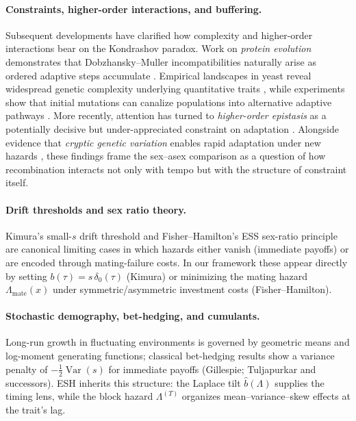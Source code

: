 \documentclass[11pt]{article}
\theoremstyle{upright}
\newcommand{\Var}{\operatorname{Var}}
\newcommand{\hazT}[1]{\Lambda^{(#1)}}          %
\begin{document}
\paragraph{Constraints, higher-order interactions, and buffering.}
Subsequent developments have clarified how complexity and higher-order interactions bear on the Kondrashov paradox. Work on \emph{protein evolution} demonstrates that Dobzhansky–Muller incompatibilities naturally arise as ordered adaptive steps accumulate \citep{Kondrashov2002}. Empirical landscapes in yeast reveal widespread genetic complexity underlying quantitative traits \citep{Brem2005}, while experiments show that initial mutations can canalize populations into alternative adaptive pathways \citep{Salverda2011}. More recently, attention has turned to \emph{higher-order epistasis} as a potentially decisive but under-appreciated constraint on adaptation \citep{Weinreich2013}. Alongside evidence that \emph{cryptic genetic variation} enables rapid adaptation under new hazards \citep{Hayden2011}, these findings frame the sex–asex comparison as a question of how recombination interacts not only with tempo but with the structure of constraint itself.

\paragraph{Drift thresholds and sex ratio theory.}
Kimura’s small-$s$ drift threshold and Fisher--Hamilton’s ESS sex-ratio principle are canonical limiting cases in which hazards either vanish (immediate payoffs) or are encoded through mating-failure costs. In our framework these appear directly by setting $b(\tau)=s\,\delta_0(\tau)$ (Kimura) or minimizing the mating hazard $\Lambda_{\mathrm{mate}}(x)$ under symmetric/asymmetric investment costs (Fisher--Hamilton).

\paragraph{Stochastic demography, bet-hedging, and cumulants.}
Long-run growth in fluctuating environments is governed by geometric means and log-moment generating functions; classical bet-hedging results show a variance penalty of $-\tfrac12\Var(s)$ for immediate payoffs (Gillespie; Tuljapurkar \citep{Tuljapurkar1982} and successors). ESH inherits this structure: the Laplace tilt $\widehat b(\Lambda)$ supplies the timing lens, while the block hazard $\hazT{T}$ organizes mean–variance–skew effects at the trait’s lag.
\end{document}
